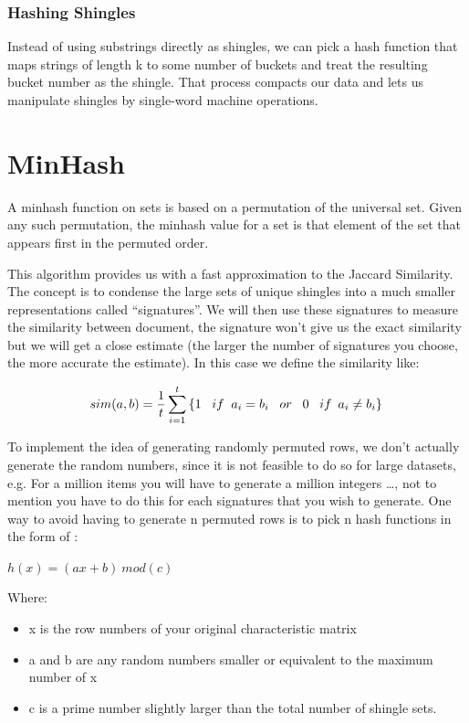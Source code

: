 \documentclass[12pt]{article}
\begin{document}
\subsubsection{Hashing Shingles}

Instead of using substrings directly as shingles, we can pick a hash function that maps strings of length k to some number of buckets and treat the resulting bucket number as the shingle. That process compacts our data and lets us manipulate shingles by single-word machine operations.

\section{MinHash}

A minhash function on sets is based on a permutation of the universal set. Given any such permutation, the minhash value for a set is that element of the set that appears first in the permuted order. 

This algorithm provides us with a fast approximation to the Jaccard Similarity. The concept is to condense the large sets of unique shingles into a much smaller representations called ``signatures''. We will then use these signatures to measure the similarity between document, the signature won't give us the exact similarity but we will get a close estimate (the larger the number of signatures you choose, the more accurate the estimate). In this case we define the similarity like: 
 \medskip

$$  sim(a,b) = \frac{1}{t} \sum_{i=1}^{t}\left\{
1  \; \; \;  if \; \;  a_{i} = b_{i} \\
\; \; \;  or \; \; \;  0 \; \; \;   if\: \;  a_{i} \neq  b_{i} 
\}\right.  $$\medskip


To implement the idea of generating randomly permuted rows, we don't actually generate the random numbers, since it is not feasible to do so for large datasets, e.g. For a million items you will have to generate a million integers …, not to mention you have to do this for each signatures that you wish to generate. One way to avoid having to generate n permuted rows is to pick n hash functions in the form of :
\medbreak
\begin{center}
$ h(x)=(ax+b)\  mod(c)$
\end{center}

Where: 
\begin{itemize}
\item x is the row numbers of your original characteristic matrix
\item a and b are any random numbers smaller or equivalent to the maximum number of x 
\item c is a prime number slightly larger than the total number of shingle sets. 
\end{itemize}
\end{document}
